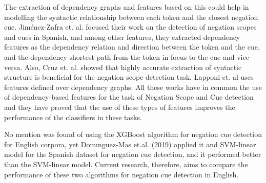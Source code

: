 The extraction of dependency graphs and features based on this could help in modelling the syntactic relationship between each token and the closest negation cue. Jiménez-Zafra et. al. \cite{jimenez2020detecting} focused their work on the detection of negation scopes and cues in Spanish, and among other features, they extracted dependency features as the dependency relation and direction between the token and the cue, and the dependency shortest path from the token in focus to the cue and vice versa. Also, Cruz et. al. \cite{cruz2016machine} showed that highly accurate extraction of syntactic structure is beneficial for the negation scope detection task. Lapponi et. al \cite{lapponi2012uio} uses features defined over dependency graphs. All these works have in common the use of dependency-based features for the task of Negation Scope and Cue detection and they have proved that the use of these types of features improves the performance of the classifiers in these tasks.

No mention was found of using the XGBoost algorithm for negation cue detection for English corpora, yet Domınguez-Mas et.al. (2019) \cite{xgb2019} applied it and SVM-linear model for the Spanish dataset for negation cue detection, and it performed better than the SVM-linear model. Current research, therefore, aims to compare the performance of these two algorithms for negation cue detection in English.  

